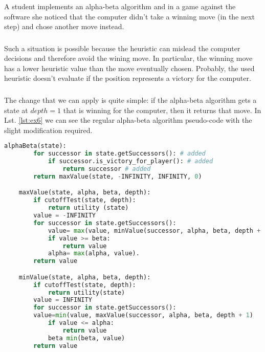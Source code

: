 A student implements an alpha-beta algorithm and in a game against the software she noticed that the computer didn't take a winning move (in the next step) and chose another move instead.

\subsubsection{}
Such a situation is possible because the heuristic can mislead the computer decisions and therefore avoid the wining move. In particular, the winning move has a lower heuristic value than the move eventually chosen. Probably, the used heuristic doesn't evaluate if the position represents a victory for the computer.

\subsubsection{}
The change that we can apply is quite simple: if the alpha-beta algorithm gets a state at $depth = 1$ that is winning for the computer, then it returns that move. In Lst. \ref{lst:ex6} we can see the regular alpha-beta algorithm pseudo-code with the slight modification required.%

\begin{lstlisting}[language=python, label={lst:ex6}, caption={Modified code: lines 2 to 4 have been added.}]
    alphaBeta(state):
        for successor in state.getSuccessors(): # added
            if successor.is_victory_for_player(): # added
                return successor # added
        return maxValue(state, -INFINITY, INFINITY, 0)

    maxValue(state, alpha, beta, depth):
        if cutoffTest(state, depth):
            return utility (state)
        value = -INFINITY
        for successor in state.getSuccessors():
            value= max(value, minValue(successor, alpha, beta, depth + 1))
            if value >= beta:
                return value
            alpha= max(alpha, value).
        return value

    minValue(state, alpha, beta, depth):
        if cutoffTest(state, depth):
            return utility(state)
        value = INFINITY
        for successor in state.getSuccessors():
        value=min(value, maxValue(successor, alpha, beta, depth + 1)
            if value <= alpha:
                return value
            beta min(beta, value)
        return value
\end{lstlisting}

